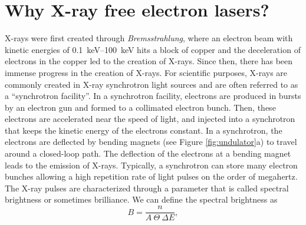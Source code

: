 \section{Why X-ray free electron lasers?}\label{sec:xfel}
X-rays were first created through \textit{Bremsstrahlung}, where an electron beam with kinetic energies of \SIrange{0.1}{100}{\kilo\electronvolt} hits a block of copper and the deceleration of electrons in the copper led to the creation of X-rays. Since then, there has been immense progress in the creation of X-rays. For scientific purposes, X-rays are commonly created in X-ray synchrotron light sources and are often referred to as a ``synchrotron facility''. In a synchrotron facility, electrons are produced in bursts by an electron gun and formed to a collimated electron bunch. Then, these electrons are accelerated near the speed of light, and injected into a synchrotron that keeps the kinetic energy of the electrons constant. In a synchrotron, the electrons are deflected by bending magnets (see Figure \ref{fig:undulator}a) to travel around a closed-loop path. The deflection of the electrons at a bending magnet leads to the emission of X-rays. Typically, a synchrotron can store many electron bunches allowing a high repetition rate of light pulses on the order of megahertz. The X-ray pulses are characterized through a parameter that is called spectral brightness \citep{Mills-2005-IUCR} or sometimes brilliance. We can define the spectral brightness as \citep{Als-Nielson-2011-JWS}
\begin{equation}
B = \frac{n}{A\ \Theta\ \Delta\! E},
\label{eq:spectral-brightness}
\end{equation}
